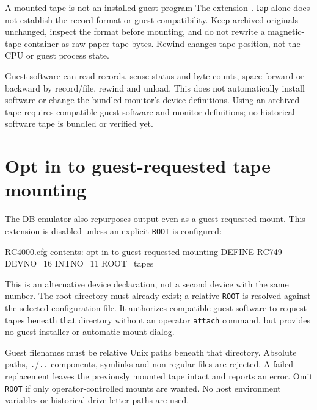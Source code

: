 \begin{operationnote}{A mounted tape is not an installed guest program}
The extension \passthrough{\lstinline!.tap!} alone does not establish the record format or guest compatibility. Keep archived originals unchanged, inspect the format before mounting, and do not rewrite a magnetic-tape container as raw paper-tape bytes. Rewind changes tape position, not the CPU or guest process state.
\end{operationnote}

Guest software can read records, sense status and byte counts, space forward or backward by record/file, rewind and unload. This does not automatically install software or change the bundled monitor's device definitions. Using an archived tape requires compatible guest software and monitor definitions; no historical software tape is bundled or verified yet.

\section{Opt in to guest-requested tape mounting}\label{opt-in-to-guest-requested-tape-mounting}

The DB emulator also repurposes output-even as a guest-requested mount. This extension is disabled unless an explicit \passthrough{\lstinline!ROOT!} is configured:

\begin{commandexample}{RC4000.cfg contents: opt in to guest-requested mounting}
DEFINE RC749 DEVNO=16 INTNO=11 ROOT=tapes
\end{commandexample}

This is an alternative device declaration, not a second device with the same number. The root directory must already exist; a relative \passthrough{\lstinline!ROOT!} is resolved against the selected configuration file. It authorizes compatible guest software to request tapes beneath that directory without an operator \passthrough{\lstinline!attach!} command, but provides no guest installer or automatic mount dialog.

Guest filenames must be relative Unix paths beneath that directory. Absolute paths, \passthrough{\lstinline!.!}/\passthrough{\lstinline!..!} components, symlinks and non-regular files are rejected. A failed replacement leaves the previously mounted tape intact and reports an error. Omit \passthrough{\lstinline!ROOT!} if only operator-controlled mounts are wanted. No host environment variables or historical drive-letter paths are used.
